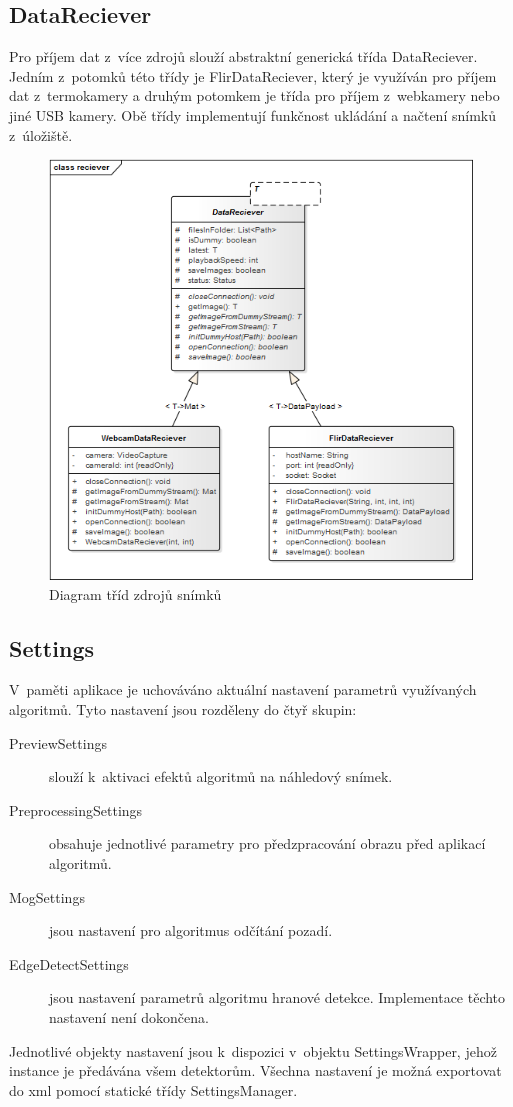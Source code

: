     \subsection{DataReciever}
    Pro příjem dat z~více zdrojů slouží abstraktní generická třída DataReciever. Jedním z~potomků této třídy je FlirDataReciever, který je využíván pro příjem dat z~termokamery a druhým potomkem je třída pro příjem z~webkamery nebo jiné USB kamery. Obě třídy implementují funkčnost ukládání a načtení snímků z~úložiště.

    \begin{figure}[h]
      \centering
      \includegraphics[width=1\textwidth]{images/ea_class_reciever.png}
      \caption{Diagram tříd zdrojů snímků}
      \label{fig:ea_class_reciever}
    \end{figure} 
    
    \subsection{Settings}
    V~paměti aplikace je uchováváno aktuální nastavení parametrů využívaných algoritmů. Tyto nastavení jsou rozděleny do čtyř skupin:
    \begin{description}
    \item [PreviewSettings] slouží k~aktivaci efektů algoritmů na náhledový snímek.
    \item [PreprocessingSettings] obsahuje jednotlivé parametry pro předzpracování obrazu před aplikací algoritmů.
    \item [MogSettings] jsou nastavení pro algoritmus odčítání pozadí.
    \item [EdgeDetectSettings] jsou nastavení parametrů algoritmu hranové detekce. Implementace těchto nastavení není dokončena.
    \end{description}
    Jednotlivé objekty nastavení jsou k~dispozici v~objektu SettingsWrapper, jehož instance je předávána všem detektorům. Všechna nastavení je možná exportovat do xml pomocí statické třídy SettingsManager.
    
